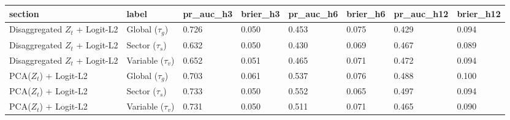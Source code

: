 \begin{tabular}{llllllll}
\toprule
section & label & pr_auc_h3 & brier_h3 & pr_auc_h6 & brier_h6 & pr_auc_h12 & brier_h12 \\
\midrule
Disaggregated $Z_t$ + Logit-L2 & Global ($\tau_g$) & 0.726 & 0.050 & 0.453 & 0.075 & 0.429 & 0.094 \\
Disaggregated $Z_t$ + Logit-L2 & Sector ($\tau_s$) & 0.632 & 0.050 & 0.430 & 0.069 & 0.467 & 0.089 \\
Disaggregated $Z_t$ + Logit-L2 & Variable ($\tau_v$) & 0.652 & 0.051 & 0.465 & 0.071 & 0.472 & 0.094 \\
PCA($Z_t$) + Logit-L2 & Global ($\tau_g$) & 0.703 & 0.061 & 0.537 & 0.076 & 0.488 & 0.100 \\
PCA($Z_t$) + Logit-L2 & Sector ($\tau_s$) & 0.733 & 0.050 & 0.552 & 0.065 & 0.497 & 0.094 \\
PCA($Z_t$) + Logit-L2 & Variable ($\tau_v$) & 0.731 & 0.050 & 0.511 & 0.071 & 0.465 & 0.090 \\
\bottomrule
\end{tabular}
